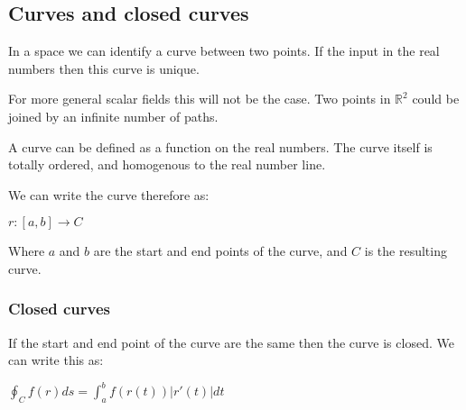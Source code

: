 
\subsection{Curves and closed curves}

In a space we can identify a curve between two points. If the input in the real numbers then this curve is unique.

For more general scalar fields this will not be the case. Two points in \(\mathbb{R}^2\) could be joined by an infinite number of paths.

A curve can be defined as a function on the real numbers. The curve itself is totally ordered, and homogenous to the real number line.

We can write the curve therefore as:

\(r:[a,b]\rightarrow C\)

Where \(a\) and \(b\) are the start and end points of the curve, and \(C\) is the resulting curve.

\subsubsection{Closed curves}

If the start and end point of the curve are the same then the curve is closed. We can write this as:

\(\oint_C f(r) ds =\int_a^b f(r(t)) |r'(t)| dt\)

